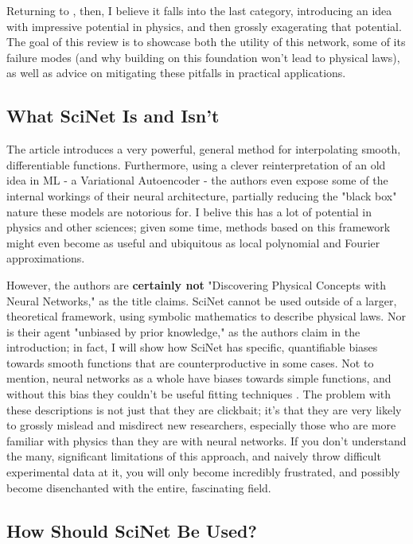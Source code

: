 \documentclass[aps,prl,preprint,groupedaddress]{revtex4-1}
\begin{document}
Returning to \cite{iten2020}, then, I believe it falls into the last category, introducing an idea with impressive potential in physics, and then grossly exagerating that potential. The goal of this review is to showcase both the utility of this network, some of its failure modes (and why building on this foundation won't lead to physical laws), as well as advice on mitigating these pitfalls in practical applications.

\subsection{What SciNet Is and Isn't}

The article introduces a very powerful, general method for interpolating smooth, differentiable functions. Furthermore, using a clever reinterpretation of an old idea in ML - a Variational Autoencoder \cite{VAE} - the authors even expose some of the internal workings of their neural architecture, partially reducing the "black box" nature these models are notorious for. I belive this has a lot of potential in physics and other sciences; given some time, methods based on this framework might even become as useful and ubiquitous as local polynomial and Fourier approximations.

However, the authors are \textbf{certainly not} "Discovering Physical Concepts with Neural Networks," as the title claims. SciNet cannot be used outside of a larger, theoretical framework, using symbolic mathematics to describe physical laws. Nor is their agent "unbiased by prior knowledge," as the authors claim in the introduction; in fact, I will show how SciNet has specific, quantifiable biases towards smooth functions that are counterproductive in some cases. Not to mention, neural networks as a whole have biases towards simple functions, and without this bias they couldn't be useful fitting techniques \cite{simplicityBias}. The problem with these descriptions is not just that they are clickbait; it's that they are very likely to grossly mislead and misdirect new researchers, especially those who are more familiar with physics than they are with neural networks. If you don't understand the many, significant limitations of this approach, and naively throw difficult experimental data at it, you will only become incredibly frustrated, and possibly become disenchanted with the entire, fascinating field.

\subsection{How Should SciNet Be Used?} 
\end{document}
